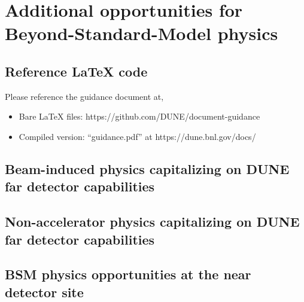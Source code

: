 \chapter{Additional opportunities for Beyond-Standard-Model physics }
\label{ch:bsm}

\section{Reference LaTeX code}

Please reference the guidance document at, 

\begin{itemize}
\item Bare LaTeX files: https://github.com/DUNE/document-guidance
\item Compiled version: ``guidance.pdf'' at https://dune.bnl.gov/docs/
\end{itemize}


\section{Beam-induced physics capitalizing on DUNE far detector capabilities}
\label{sec:bsm-beam}


\section{Non-accelerator physics capitalizing on DUNE far detector capabilities}
\label{sec:bsm-nonaccel}


\section{BSM physics opportunities at the near detector site}
\label{sec:bsm-nd}

